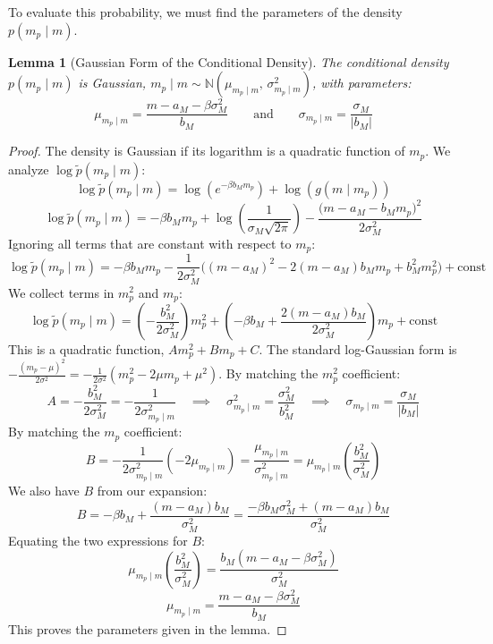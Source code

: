 \documentclass[extra,mreferee]{gji}
\theoremstyle{lemma}
\newtheorem{lemma}{Lemma}
\def\N{\mathbb{N}}
\begin{document}
To evaluate this probability, we must find the parameters of the density $p(m_p \mid m)$.

\begin{lemma}[Gaussian Form of the Conditional Density]
The conditional density $p(m_p \mid m)$ is Gaussian, $m_p\mid m \sim \N\!\left(\mu_{m_p\mid m},\,\sigma_{m_p\mid m}^2\right)$, with parameters:
\[
\mu_{m_p\mid m}=\frac{m-a_M-\beta\sigma_M^2}{b_M} \qquad \mathrm{and} \qquad \sigma_{m_p\mid m}=\frac{\sigma_M}{|b_M|}
\]
\end{lemma}

\begin{proof}
The density is Gaussian if its logarithm is a quadratic function of $m_p$. We analyze $\log \tilde{p}(m_p\mid m)$:
\[
\log \tilde{p}(m_p\mid m) = \log(e^{-\beta b_M m_p}) + \log(g(m\mid m_p))
\]
\[
\log \tilde{p}(m_p\mid m) = -\beta b_M m_p + \log\left(\frac{1}{\sigma_M\sqrt{2\pi}}\right) -\frac{\big(m-a_M-b_M m_p\big)^2}{2\sigma_M^2}
\]
Ignoring all terms that are constant with respect to $m_p$:
\[
\log \tilde{p}(m_p\mid m) = -\beta b_M m_p -\frac{1}{2\sigma_M^2}\Big( (m-a_M)^2 - 2(m-a_M)b_M m_p + b_M^2 m_p^2 \Big) + \mathrm{const}
\]
We collect terms in $m_p^2$ and $m_p$:
\[
\log \tilde{p}(m_p\mid m) = \left(-\frac{b_M^2}{2\sigma_M^2}\right)m_p^2 + \left(-\beta b_M + \frac{2(m-a_M)b_M}{2\sigma_M^2}\right)m_p + \mathrm{const}
\]
This is a quadratic function, $Am_p^2 + Bm_p + C$. The standard log-Gaussian form is $-\frac{(m_p-\mu)^2}{2\sigma^2} = -\frac{1}{2\sigma^2}(m_p^2 - 2\mu m_p + \mu^2)$.
By matching the $m_p^2$ coefficient:
\[
A = -\frac{b_M^2}{2\sigma_M^2} = -\frac{1}{2\sigma_{m_p\mid m}^2} \quad \implies \quad \sigma_{m_p\mid m}^2 = \frac{\sigma_M^2}{b_M^2} \quad \implies \quad \sigma_{m_p\mid m} = \frac{\sigma_M}{|b_M|}
\]
By matching the $m_p$ coefficient:
\[
B = -\frac{1}{2\sigma_{m_p\mid m}^2}(-2\mu_{m_p\mid m}) = \frac{\mu_{m_p\mid m}}{\sigma_{m_p\mid m}^2} = \mu_{m_p\mid m} \left(\frac{b_M^2}{\sigma_M^2}\right)
\]
We also have $B$ from our expansion:
\[
B = -\beta b_M + \frac{(m-a_M)b_M}{\sigma_M^2} = \frac{-\beta b_M \sigma_M^2 + (m-a_M)b_M}{\sigma_M^2}
\]
Equating the two expressions for $B$:
\[
\mu_{m_p\mid m} \left(\frac{b_M^2}{\sigma_M^2}\right) = \frac{b_M(m-a_M-\beta \sigma_M^2)}{\sigma_M^2}
\]
\[
\mu_{m_p\mid m} = \frac{m-a_M-\beta\sigma_M^2}{b_M}
\]
This proves the parameters given in the lemma.
\end{proof}
\end{document}
